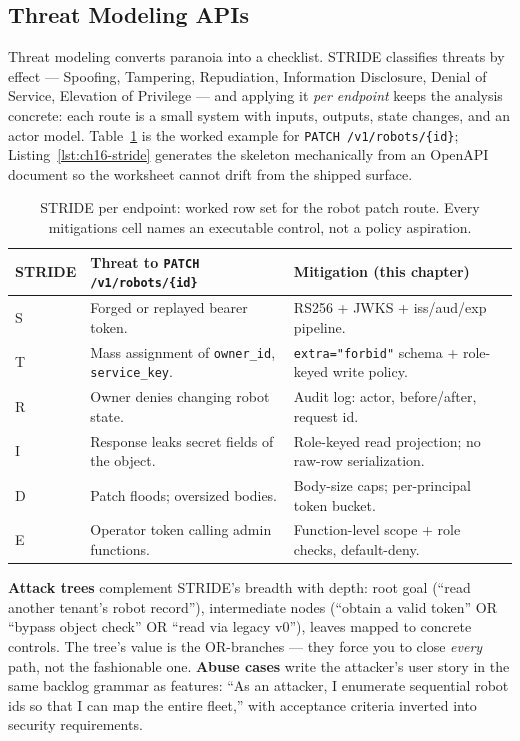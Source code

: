 \subsection{Threat Modeling APIs}
\label{sec:ch16-threatmodel}

Threat modeling converts paranoia into a checklist. STRIDE classifies
threats by effect --- Spoofing, Tampering, Repudiation, Information
Disclosure, Denial of Service, Elevation of Privilege --- and applying it
\emph{per endpoint} keeps the analysis concrete: each route is a small
system with inputs, outputs, state changes, and an actor model.
Table~\ref{tab:ch16-stride} is the worked example for
\texttt{PATCH /v1/robots/\{id\}}; Listing~\ref{lst:ch16-stride} generates
the skeleton mechanically from an OpenAPI document so the worksheet cannot
drift from the shipped surface.

\begin{table}[ht]
\centering\small
\begin{tabularx}{\textwidth}{l X X}
\toprule
\textbf{STRIDE} & \textbf{Threat to \texttt{PATCH /v1/robots/\{id\}}} & \textbf{Mitigation (this chapter)} \\
\midrule
S & Forged or replayed bearer token. & RS256 + JWKS + iss/aud/exp pipeline. \\
T & Mass assignment of \texttt{owner\_id}, \texttt{service\_key}. & \texttt{extra="forbid"} schema + role-keyed write policy. \\
R & Owner denies changing robot state. & Audit log: actor, before/after, request id. \\
I & Response leaks secret fields of the object. & Role-keyed read projection; no raw-row serialization. \\
D & Patch floods; oversized bodies. & Body-size caps; per-principal token bucket. \\
E & Operator token calling admin functions. & Function-level scope + role checks, default-deny. \\
\bottomrule
\end{tabularx}
\caption{STRIDE per endpoint: worked row set for the robot patch route.
Every mitigations cell names an executable control, not a policy
aspiration.}
\label{tab:ch16-stride}
\end{table}

\textbf{Attack trees} complement STRIDE's breadth with depth: root goal
(``read another tenant's robot record''), intermediate nodes (``obtain a
valid token'' OR ``bypass object check'' OR ``read via legacy v0''), leaves
mapped to concrete controls. The tree's value is the OR-branches --- they
force you to close \emph{every} path, not the fashionable one.
\textbf{Abuse cases} write the attacker's user story in the same backlog
grammar as features: ``As an attacker, I enumerate sequential robot ids so
that I can map the entire fleet,'' with acceptance criteria inverted into
security requirements.

